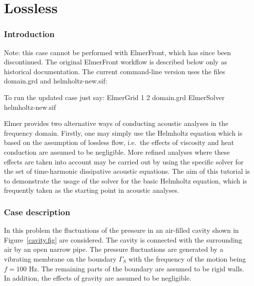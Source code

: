 \chapter{Lossless }



\subsection*{Introduction}

Note: this case cannot be performed with ElmerFront, which has since been
discontinued. The original ElmerFront workflow is described below only as
historical documentation. The current command-line version uses the files
domain.grd and helmholtz-new.sif:

To run the updated case just say:
\ttbegin
ElmerGrid 1 2 domain.grd
ElmerSolver helmholtz-new.sif
\ttend

Elmer provides two alternative ways of conducting acoustic analyses in the
frequency domain. Firstly, one may simply use the Helmholtz equation which 
is based on the assumption of lossless flow, i.e.\ the effects of viscosity 
and heat conduction are assumed to be negligible. More refined analyses where 
these effects are taken into account may be carried out by using the specific 
solver for the set of time-harmonic dissipative acoustic equations. 
The aim of this tutorial is to demonstrate the usage of the solver
for the basic Helmholtz equation, which is frequently taken as the starting
point in acoustic analyses. 

\subsection*{Case description}

In this problem the fluctuations of the pressure in an air-filled
cavity shown in Figure~\ref{cavity.fig} are considered. The cavity is 
connected with the surrounding air by an open narrow pipe. The pressure 
fluctuations are generated by a vibrating membrane on the boundary $\Gamma_S$ 
with the frequency of the motion being $f=100$ Hz. 
The remaining parts of the boundary are assumed to be rigid walls. 
In addition, the effects of gravity are assumed to be negligible.

